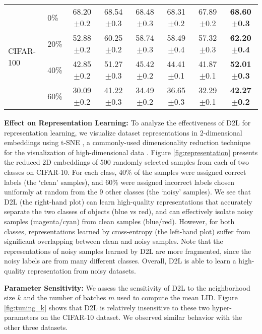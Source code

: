 \documentclass{article}
\begin{document}
\begin{table*}[!tb]
\begin{tabular}{ll|cccccc}
\hline
\multirow{4}{*}{CIFAR-100}
& 0\% & 68.20$\pm$0.2 & 68.54$\pm$0.3 & 68.48$\pm$0.3 & 68.31$\pm$0.2 & 67.89$\pm$0.2 & \textbf{68.60$\pm$0.3}  \\
& 20\% & 52.88$\pm$0.2  & 60.25$\pm$0.2 & 58.74$\pm$0.3 & 58.49$\pm$0.4 & 57.32$\pm$0.3 & \textbf{62.20$\pm$0.4}  \\
& 40\% & 42.85$\pm$0.2  & 51.27$\pm$0.3 & 45.42$\pm$0.2 & 44.41$\pm$0.1 & 41.87$\pm$0.1 & \textbf{52.01$\pm$0.3}  \\
& 60\% & 30.09$\pm$0.2  & 41.22$\pm$0.3 & 34.49$\pm$0.2 & 36.65$\pm$0.3 & 32.29$\pm$0.1 & \textbf{42.27$\pm$0.2}  \\
\hline
\end{tabular}
\end{table*}


\textbf{Effect on Representation Learning:}
\label{sec:regularization}
To analyze the effectiveness of D2L for representation learning, we visualize dataset representations in 2-dimensional embeddings using t-SNE \cite{maaten2008visualizing}, a commonly-used dimensionality reduction technique for the visualization of high-dimensional data \cite{lecun2015deep}. Figure \ref{fig:representation} presents the reduced 2D embeddings of 500 randomly selected samples from each of two classes on CIFAR-10. For each class, 40\% of the samples were assigned correct labels (the `clean' samples), and 60\% were assigned incorrect labels chosen uniformly at random from the 9 other classes (the `noisy' samples). We see that D2L (the right-hand plot) can learn high-quality representations that accurately separate the two classes of objects (blue vs red), and can effectively isolate noisy samples (magenta/cyan) from clean samples (blue/red). However, for both classes, representations learned by cross-entropy (the left-hand plot) suffer from significant overlapping between clean and noisy samples. Note that the representations of noisy samples learned by D2L are more fragmented, since the noisy labels are from many different classes. Overall, D2L is able to learn a high-quality representation from noisy datasets.







\textbf{Parameter Sensitivity:} We assess the sensitivity of D2L to the neighborhood size $k$ and the number of batches $m$ used to compute the mean LID. Figure \ref{fig:tuning_k} shows that D2L is relatively insensitive to these two hyper-parameters on the CIFAR-10 dataset. We observed similar behavior with the other three datasets.
\end{document}
